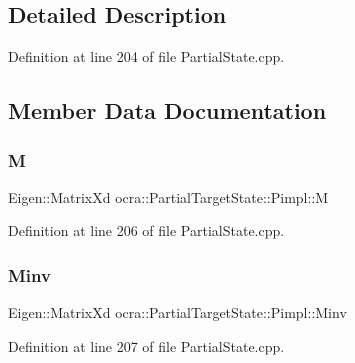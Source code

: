 \subsection{Detailed Description}


Definition at line 204 of file Partial\+State.\+cpp.



\subsection{Member Data Documentation}
\hypertarget{structocra_1_1PartialTargetState_1_1Pimpl_acf8d5f65cf416eda2285044fb31e16dd}{}\label{structocra_1_1PartialTargetState_1_1Pimpl_acf8d5f65cf416eda2285044fb31e16dd} 
\subsubsection{\texorpdfstring{M}{M}}
{\footnotesize\ttfamily Eigen\+::\+Matrix\+Xd ocra\+::\+Partial\+Target\+State\+::\+Pimpl\+::M}



Definition at line 206 of file Partial\+State.\+cpp.

\hypertarget{structocra_1_1PartialTargetState_1_1Pimpl_a14905360b00dea81b81fd48960fbe7a5}{}\label{structocra_1_1PartialTargetState_1_1Pimpl_a14905360b00dea81b81fd48960fbe7a5} 
\subsubsection{\texorpdfstring{Minv}{Minv}}
{\footnotesize\ttfamily Eigen\+::\+Matrix\+Xd ocra\+::\+Partial\+Target\+State\+::\+Pimpl\+::\+Minv}



Definition at line 207 of file Partial\+State.\+cpp.

\hypertarget{structocra_1_1PartialTargetState_1_1Pimpl_a0d72ffd9b45ff335dee37874459dfc8d}{}\label{structocra_1_1PartialTargetState_1_1Pimpl_a0d72ffd9b45ff335dee37874459dfc8d} 
